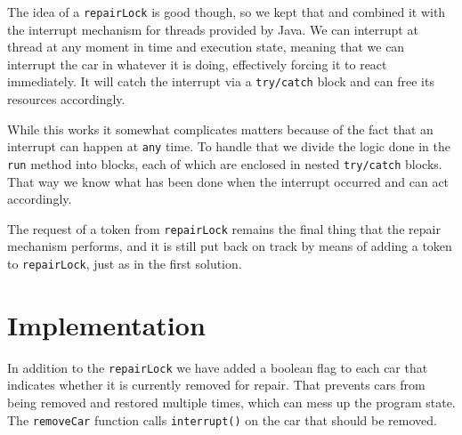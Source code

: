 The idea of a \texttt{repairLock} is good though, so we kept that and combined it with the interrupt mechanism for threads provided by Java. We can interrupt at thread at any moment in time and execution state, meaning that we can interrupt the car in whatever it is doing, effectively forcing it to react immediately. It will catch the interrupt via a \texttt{try/catch} block and can free its resources accordingly.

While this works it somewhat complicates matters because of the fact that an interrupt can happen at \texttt{any} time. To handle that we divide the logic done in the \texttt{run} method into blocks, each of which are enclosed in nested \texttt{try/catch} blocks. That way we know what has been done when the interrupt occurred and can act accordingly.

The request of a token from \texttt{repairLock} remains the final thing that the repair mechanism performs, and it is still put back on track by means of adding a token to \texttt{repairLock}, just as in the first solution.

\section{Implementation}
In addition to the \texttt{repairLock} we have added a boolean flag to each car that indicates whether it is currently removed for repair. That prevents cars from being removed and restored multiple times, which can mess up the program state. The \texttt{removeCar} function calls \texttt{interrupt()} on the car that should be removed.


